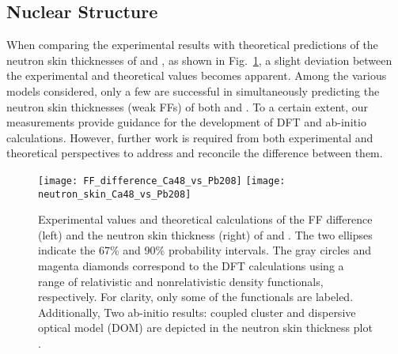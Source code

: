 \subsection{Nuclear Structure}
\begin{comment}
    QCD ==> EFT ==> Interactions ==> ab-initio ==> shell model ==> DFT
\end{comment}

When comparing the experimental results with theoretical predictions of the neutron
skin thicknesses of \Pb and \Ca, as shown in Fig.~\ref{fig:pcrex_R_skin}, a slight
deviation between the experimental and theoretical values becomes apparent. 
Among the various models considered, only a few are successful in simultaneously 
predicting the neutron skin thicknesses (weak FFs) of both \Pb and \Ca. 
To a certain extent, our measurements provide guidance for the development of DFT and ab-initio 
calculations. However, further work is required from both experimental and theoretical 
perspectives to address and reconcile the difference between them. 

\begin{figure}[!h]
    \centering
    \texttt{[image: FF\_difference\_Ca48\_vs\_Pb208]}
    \texttt{[image: neutron\_skin\_Ca48\_vs\_Pb208]}
    \caption[FF and Rskin difference]
    {Experimental values and theoretical calculations of the FF difference (left)
    and the neutron skin thickness (right) of \Pb and \Ca. The two ellipses indicate
    the 67\% and 90\% probability intervals. The gray circles and magenta diamonds correspond
    to the DFT calculations using a range of relativistic and nonrelativistic density functionals,
    respectively. For clarity, only some of the functionals are labeled. 
    Additionally, Two ab-initio results:
    coupled cluster and dispersive optical model (DOM) are depicted in the 
    neutron skin thickness plot \cite{PhysRevLett.129.042501}.
    }
    \label{fig:pcrex_R_skin}
\end{figure}


